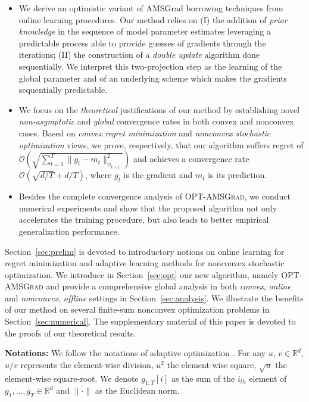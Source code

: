 \documentclass[wcp]{jmlr}
\begin{document}
\begin{itemize}
\item We derive an optimistic variant of AMSGrad borrowing techniques from online learning procedures. Our method relies on \textsf{(I)} the addition of \emph{prior knowledge} in the sequence of model parameter estimates leveraging a predictable process able to provide guesses of gradients through the iterations; \textsf{(II)} the construction of a \emph{double update} algorithm done sequentially. We interpret this two-projection step as the learning of the global parameter and of an underlying scheme which makes the gradients sequentially predictable.
\item We focus on the  \emph{theoretical} justifications of our method by establishing novel \emph{non-asymptotic} and \emph{global} convergence rates in both convex and nonconvex cases.  Based on \emph{convex regret minimization} and \emph{nonconvex stochastic optimization} views, we prove, respectively, that our algorithm suffers regret of $\mathcal{O}(\sqrt{\sum_{t=1}^T \| g_t - m_t  \|^2_{\psi_{t-1}}})$ and achieves a convergence rate $\mathcal{O}(\sqrt{d/T} +d/T )$, where $g_t$ is the gradient and $m_t$ is its prediction.
\item Besides the complete convergence analysis of \textsc{OPT-AMSGrad}, we conduct numerical experiments and show that the proposed algorithm not only accelerates the training procedure, but also leads to better empirical generalization performance.
\end{itemize}

Section~\ref{sec:prelim} is devoted to introductory notions on online learning for regret minimization and adaptive learning methods for nonconvex stochastic optimization. We introduce in Section~\ref{sec:opt} our new algorithm, namely \textsc{OPT-AMSGrad} and provide a comprehensive global analysis in both \emph{convex}, \emph{online}  and \emph{nonconvex}, \emph{offline} settings in Section~\ref{sec:analysis}.
We illustrate the benefits of our method on several finite-sum nonconvex optimization problems in Section~\ref{sec:numerical}.
The supplementary material of this paper is devoted to the proofs of our theoretical results.

\textbf{Notations:} 
We follow the notations of adaptive optimization \citep{KB15,RKK18}. 
For any $u$, $v \in \mathbb R^{d}$,  $u/v$ represents the element-wise division,
$u^{2}$ the element-wise square, $\sqrt{u}$ the element-wise square-root.
We denote $g_{1:T}[i]$ as the sum of the $i_{th}$ element of $g_{1},\dots, g_{T} \in \mathbb R^{d}$ and $\| \cdot \|$ as the Euclidean norm.
\end{document}
